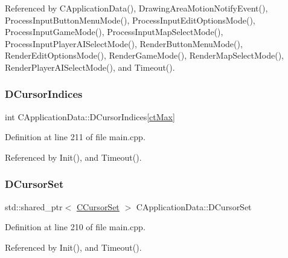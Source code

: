 Referenced by C\+Application\+Data(), Drawing\+Area\+Motion\+Notify\+Event(), Process\+Input\+Button\+Menu\+Mode(), Process\+Input\+Edit\+Options\+Mode(), Process\+Input\+Game\+Mode(), Process\+Input\+Map\+Select\+Mode(), Process\+Input\+Player\+A\+I\+Select\+Mode(), Render\+Button\+Menu\+Mode(), Render\+Edit\+Options\+Mode(), Render\+Game\+Mode(), Render\+Map\+Select\+Mode(), Render\+Player\+A\+I\+Select\+Mode(), and Timeout().

\hypertarget{classCApplicationData_a3f4e69d928f933bba6e1c388c5a720a2}{}\label{classCApplicationData_a3f4e69d928f933bba6e1c388c5a720a2} 
\subsubsection{\texorpdfstring{D\+Cursor\+Indices}{DCursorIndices}}
{\footnotesize\ttfamily int C\+Application\+Data\+::\+D\+Cursor\+Indices\mbox{[}\hyperlink{classCApplicationData_ad024b66b60017c45c47a85dbc636ae69a57f089bfb5f201e4f592dd2e41888a44}{ct\+Max}\mbox{]}\hspace{0.3cm}{\ttfamily [protected]}}



Definition at line 211 of file main.\+cpp.



Referenced by Init(), and Timeout().

\hypertarget{classCApplicationData_aab67bfc9fa6708d7900ff654f9da05c7}{}\label{classCApplicationData_aab67bfc9fa6708d7900ff654f9da05c7} 
\subsubsection{\texorpdfstring{D\+Cursor\+Set}{DCursorSet}}
{\footnotesize\ttfamily std\+::shared\+\_\+ptr$<$ \hyperlink{classCCursorSet}{C\+Cursor\+Set} $>$ C\+Application\+Data\+::\+D\+Cursor\+Set\hspace{0.3cm}{\ttfamily [protected]}}



Definition at line 210 of file main.\+cpp.



Referenced by Init(), and Timeout().

